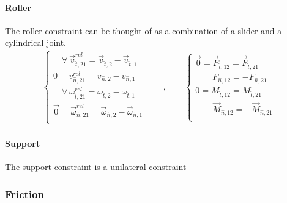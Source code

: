 \documentclass[letterpaper,10pt,english]{jupyterBook}
\begin{document}
\paragraph{Roller}
\label{\detokenize{ch/actions-reactions:roller}}
\sphinxAtStartPar
The roller constraint can be thought of as a combination of a slider and a cylindrical joint.
\begin{equation*}
\begin{split}
\begin{cases}
  \quad \forall \ \vec{v}^{rel}_{\hat{t},21}     = \vec{v}_{\hat{t},2}     - \vec{v}_{\hat{t},1} \\
          0  = v^{rel}_{\hat{n},21}     = v_{\hat{n},2}     - v_{\hat{n},1} \\
  \quad \forall \ \omega^{rel}_{\hat{t},21} = \omega_{\hat{t},2} - \omega_{\hat{t},1} \\
  \vec{0} = \vec{\omega}^{rel}_{\hat{n},21} = \vec{\omega}_{\hat{n},2} - \vec{\omega}_{\hat{n},1} \\
\end{cases}
\qquad , \qquad
\begin{cases}
  \vec{0} = \vec{F}_{\hat{t},12} = \vec{F}_{\hat{t},21} \\
  \qquad F_{\hat{n},12} = - F_{\hat{n},21} \\
  0 =  M_{\hat{t},12} = M_{\hat{t},21} \\
  \qquad \vec{M}_{\hat{n},12} = - \vec{M}_{\hat{n},21} \\
\end{cases}
\end{split}
\end{equation*}

\paragraph{Support}
\label{\detokenize{ch/actions-reactions:support}}
\sphinxAtStartPar
The support constraint is a unilateral constraint  


\subsubsection{Friction}
\label{\detokenize{ch/actions-reactions:friction}}
\end{document}
